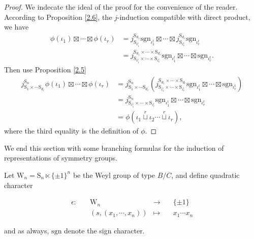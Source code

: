 \documentclass[12pt, a4paper]{amsart}
\numberwithin{equation}{section}
\newcommand{\sgn}{{\mathrm{sgn}}}
\newcommand{\defmap}[5]{
           \begin{equation*}
              \begin{aligned}
                   #1:\quad  & #2 &\longrightarrow &\quad #3 \\
                      \quad  & #4    &\longmapsto  &\quad #5
              \end{aligned}
           \end{equation*}
          }
\begin{document}
\begin{proof}
    We indecate the ideal of the proof for the convenience of the reader.
    According to Proposition \ref{2.6}, the $j$-induction compatible with direct product, we have
    \begin{align}
        \phi(\iota_1) \boxtimes \cdots \boxtimes \phi(\iota_r) & = j^{\mathrm{S}_{d_1}}_{\mathrm{S}_{\iota_{1}^t}}\sgn_{\iota_1^t} \boxtimes \cdots \boxtimes j^{\mathrm{S}_{d_r}}_{\mathrm{S}_{\iota_{r}^t}}\sgn_{\iota_r^t}\\
        & = j_{\mathrm{S}_{\iota_{1}^t} \times \cdots \times \mathrm{S}_{\iota_{r}^t}}^{\mathrm{S}_{d_1} \times \cdots \times \mathrm{S}_{d_r}}\sgn_{\iota_{1}^t} \boxtimes \cdots \boxtimes \sgn_{\iota_{r}^t}.
    \end{align}
    Then use Proposition \ref{2.5}
    \begin{align}
         j_{\mathrm{S}_1 \times \cdots \mathrm{S}_{d_r}}^{\mathrm{S}_n}\phi(\iota_1) \boxtimes \cdots \boxtimes \phi(\iota_r) & = j_{\mathrm{S}_1 \times \cdots \mathrm{S}_{d_r}}^{\mathrm{S}_n}(j_{\mathrm{S}_{\iota_{1}^t} \times \cdots \times \mathrm{S}_{\iota_{r}^t}}^{\mathrm{S}_{d_1} \times \cdots \times \mathrm{S}_{d_r}}\sgn_{\iota_{1}^t} \boxtimes \cdots \boxtimes \sgn_{\iota_{r}^t})\\
         & = j^{\mathrm{S}_n}_{\mathrm{S}_{\iota_{1}^t} \times \cdots \times \mathrm{S}_{\iota_{r}^t}}\sgn_{\iota_{1}^t} \boxtimes \cdots \boxtimes \sgn_{\iota_{r}^t}\\
         & = \phi(\iota_1 \mathop{\sqcup}\limits^r \iota_2 \cdots \mathop{\sqcup}\limits^r  \iota_r),
    \end{align}
    where the third equality is the definition of $\phi$.
\end{proof}

We end this section with some branching formulas for the induction of representations of symmetry groups. 

Let $\mathrm{W}_n = \mathrm{S}_{n} \ltimes \{\pm 1\}^n$ be the Weyl group of type $B/C$, and define quadratic character 
\defmap{\epsilon}{\mathrm{W}_n}{\{\pm 1\}}{(s,(x_1, \cdots, x_n))}{x_1\cdots x_n}
and as always, $\sgn$ denote the sign character.
\end{document}
